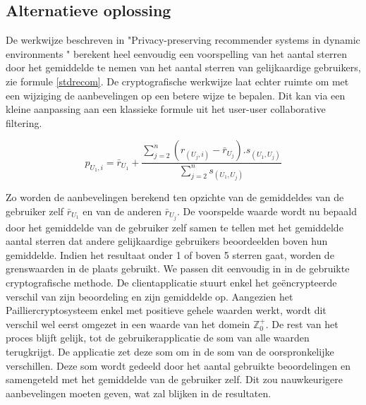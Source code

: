 \subsection{Alternatieve oplossing}
De werkwijze beschreven in "Privacy-preserving recommender systems in dynamic environments \cite{ZErkinDyn}" berekent heel eenvoudig een voorspelling van het aantal sterren door het gemiddelde te nemen van het aantal sterren van gelijkaardige gebruikers, zie formule \ref{stdrecom}. De cryptografische werkwijze laat echter ruimte om met een wijziging de aanbevelingen op een betere wijze te bepalen. Dit kan via een kleine aanpassing aan een klassieke formule uit het user-user collaborative filtering.

\begin{equation}\label{stdrecom}p_{U_1,i} = \bar{r}_{U_1} + \frac{\sum_{j=2}^{n}(r_{(U_j,i)} - \bar{r}_{U_j}).s_{(U_1,U_j)}}{\sum_{j=2}^{n} s_{(U_1,U_j)}}
\end{equation}

Zo worden de aanbevelingen berekend ten opzichte van de gemiddeldes van de gebruiker zelf $\bar{r}_{U_1}$ en van de anderen $\bar{r}_{U_j}$. De voorspelde waarde wordt nu bepaald door het gemiddelde van de gebruiker zelf samen te tellen met het gemiddelde aantal sterren dat andere gelijkaardige gebruikers beoordeelden boven hun gemiddelde. Indien het resultaat onder 1 of boven 5 sterren gaat, worden de grenswaarden in de plaats gebruikt.
We passen dit eenvoudig in in de gebruikte cryptografische methode. De clientapplicatie stuurt enkel het ge\"encrypteerde verschil van zijn beoordeling en zijn gemiddelde op. Aangezien het Pailliercryptosysteem enkel met positieve gehele waarden werkt, wordt dit verschil wel eerst omgezet in een waarde van het domein $\mathbb{Z}^{+}_{0}$. De rest van het proces blijft gelijk, tot de gebruikerapplicatie de som van alle waarden terugkrijgt. De applicatie zet deze som om in de som van de oorspronkelijke verschillen. Deze som wordt gedeeld door het aantal gebruikte beoordelingen en samengeteld met het gemiddelde van de gebruiker zelf. Dit zou nauwkeurigere aanbevelingen moeten geven, wat zal blijken in de resultaten.